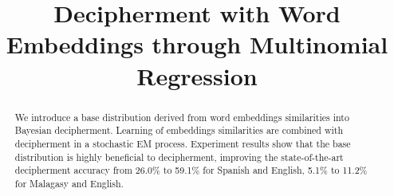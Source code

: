 \documentclass[11pt]{article}
\title{Decipherment with Word Embeddings through Multinomial Regression}
\date{}
\begin{document}
\maketitle
\begin{abstract}
We introduce a base distribution derived from word embeddings similarities into Bayesian decipherment. Learning of embeddings similarities are combined with decipherment in a stochastic EM process. Experiment results show that the base distribution is highly beneficial to decipherment, improving the state-of-the-art decipherment accuracy from 26.0\% to 59.1\% for Spanish and English, 5.1\% to 11.2\% for Malagasy and English. 
\end{abstract}




%
%








\end{document}
